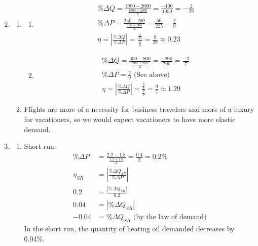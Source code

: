 \documentclass{article}
\begin{document}
\begin{enumerate}
\setcounter{enumi}{1}

\item

	\begin{enumerate}
	
	\item 
	
		\begin{enumerate}
		
		\item 
		\begin{gather*}
		\% \Delta Q = \frac{1900 - 2000}{\frac{1900 + 2000}{2}} = \frac{-100}{1950} = -\frac{2}{39} \\
		\% \Delta P = \frac{250 - 200}{\frac{250 + 200}{2}}  = \frac{50}{225} = \frac{2}{9} \\
		\eta = \left| \frac{\% \Delta Q}{\% \Delta P} \right| = \frac{\frac{2}{39}}{\frac{2}{9}} = \frac{9}{39} \approx 0.23
		\end{gather*}
		
		\item
		\begin{gather*}
		\% \Delta Q = \frac{600 - 800}{\frac{600 + 800}{2}} = \frac{-200}{700} = \frac{-2}{7} \\
		\% \Delta P = \frac{2}{9} \text{ (See above)} \\
		\eta = \left| \frac{\% \Delta Q}{\% \Delta P} \right| = \frac{\frac{2}{7}}{\frac{2}{9}} = \frac{9}{7} \approx 1.29
		\end{gather*}
		
		\end{enumerate}
		
	\item Flights are more of a necessity for business travelers and more of a luxury for vacationers, so we would expect vacationers to have more elastic demand.
	
	\end{enumerate}
	
\item

	\begin{enumerate}
	
	\item Short run:
	\begin{align*}
	\% \Delta P &= \frac{2.2 - 1.8}{\frac{2.2 + 1.8}{2}} = \frac{0.4}{2} = 0.2\% \\
	\eta_{SR} &= \left| \frac{\% \Delta Q_{SR}}{\% \Delta P} \right| \\
	0.2 &= \frac{| \% \Delta Q_{SR} |}{0.2} \\
	0.04 &= | \% \Delta Q_{SR} | \\
	-0.04 &= \% \Delta Q_{SR} \text{ (by the law of demand)}
	\end{align*}
	In the short run, the quantity of heating oil demanded decreases by 0.04\%.
	

\end{enumerate}
\end{enumerate}
\end{document}
